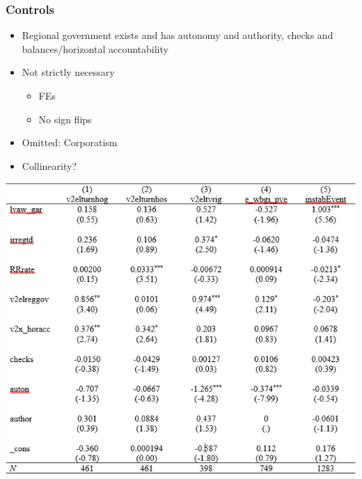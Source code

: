 \documentclass[]{beamer}
\begin{document}
\begin{frame}
\frametitle{Controls}
\begin{itemize}
\item Regional government exists and has autonomy and authority, checks and balances/horizontal accountability
\item Not strictly necessary
\begin{itemize}
\item FEs
\item No sign flips
\end{itemize}
\item Omitted: Corporatism
\item Collinearity?
\end{itemize}
\includegraphics{img0012.png}
\end{frame}
\end{document}
